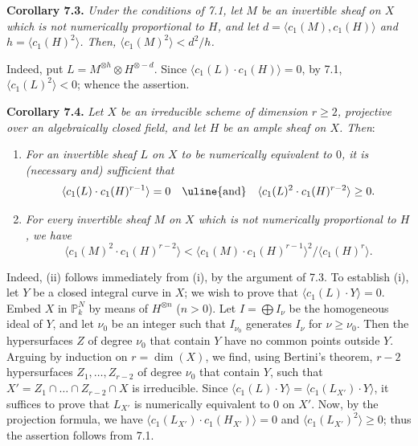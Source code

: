 \textbf{Corollary 7.3.} \emph{Under the conditions of 7.1, let $M$ be an invertible sheaf on $X$ which is not numerically proportional to $H$, and let $d=\langle c_1(M),c_1(H)\rangle$ and $h=\langle c_1(H)^2\rangle$. Then, $\langle c_1(M)^2\rangle<d^2/h$.}

Indeed, put $L=M^{\otimes h}\otimes H^{\otimes -d}$. Since $\langle c_1(L)\cdot c_1(H)\rangle=0$, by 7.1, $\langle c_1(L)^2\rangle<0$; whence the assertion.

%
\textbf{Corollary 7.4.} \emph{Let $X$ be an irreducible scheme of dimension $r\geq2$, projective over an algebraically closed field, and let $H$ be an ample sheaf on $X$. Then}:
\begin{enumerate}[label=(\roman*)]
\item \emph{For an invertible sheaf $L$ on $X$ to be numerically equivalent to $0$, it is (necessary and) sufficient that}
\[
   \langle c_1(L)\cdot c_1(H)^{r-1}\rangle=0
   \quad\hbox{\uline{and}}\quad
   \langle c_1(L)^2\cdot c_1(H)^{r-2}\rangle\geq0.
\]
\item \emph{For every invertible sheaf $M$ on $X$ which is not numerically proportional to $H$, we have}
\[
   \langle c_1(M)^2\cdot c_1(H)^{r-2}\rangle
   <
   \langle c_1(M)\cdot c_1(H)^{r-1}\rangle^2/\langle c_1(H)^r\rangle.
\]
\end{enumerate}

Indeed, (ii) follows immediately from (i), by the argument of 7.3. To establish (i), let $Y$ be a closed integral curve in $X$; we wish to prove that $\langle c_1(L)\cdot Y\rangle=0$. Embed $X$ in $\mathbb P^N_k$ by means of $H^{\otimes n}$ ($n>0$). Let $I=\bigoplus I_\nu$ be the homogeneous ideal of $Y$, and let $\nu_0$ be an integer such that $I_{\nu_0}$ generates $I_\nu$ for $\nu\geq\nu_0$. Then the hypersurfaces $Z$ of degree $\nu_0$ that contain $Y$ have no common points outside $Y$. Arguing by induction on $r=\dim(X)$, we find, using Bertini's theorem, $r-2$ hypersurfaces $Z_1,\ldots,Z_{r-2}$ of degree $\nu_0$ that contain $Y$, such that $X'=Z_1\cap\ldots\cap Z_{r-2}\cap X$ is irreducible. Since $\langle c_1(L)\cdot Y\rangle=\langle c_1(L_{X'})\cdot Y\rangle$, it suffices to prove that $L_{X'}$ is numerically equivalent to $0$ on $X'$. Now, by the projection formula, we have $\langle c_1(L_{X'})\cdot c_1(H_{X'})\rangle=0$ and $\langle c_1(L_{X'})^2\rangle\geq0$; thus the assertion follows from 7.1.

